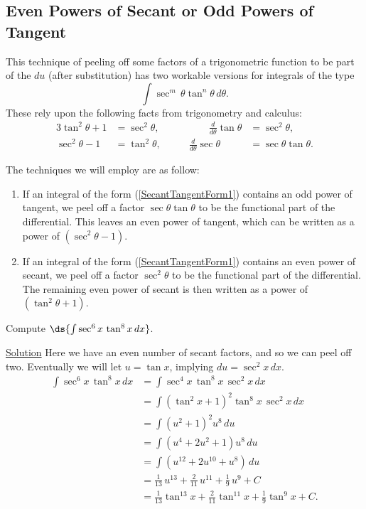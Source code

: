 \subsection{Even Powers of Secant or Odd Powers of Tangent
\label{EvenSecant/OddTangent}}
This technique of peeling off some factors of a trigonometric
function to be part of the $du$ (after substitution) has
two workable versions for integrals of the type
\begin{equation}
\int\sec^m\,\theta\tan^n\theta\,d\theta.\label{SecantTangentForm1}
\end{equation}
These rely upon the following facts from trigonometry and calculus:
\begin{alignat*}{3}
\tan^2\theta+1&=\sec^2\theta,&\qquad\qquad
            \frac{d}{d\theta}\tan\theta&=\sec^2\theta,\\
\sec^2\theta-1&=\tan^2\theta,&\qquad\frac{d}{d\theta}
        \sec\theta&=\sec\theta\tan\theta.\end{alignat*}

The techniques we will employ are as follow:
\begin{enumerate}
\item If an integral of the form (\ref{SecantTangentForm1})
contains an odd power of tangent, we peel off a factor
$\sec\theta\tan\theta$ to be the functional part of the differential.
This leaves an even power of tangent, which can be written as
a power of $\left(\sec^2\theta-1\right)$.
\item If an integral of the form (\ref{SecantTangentForm1})
contains an even power of secant, we peel off a factor
$\sec^2\theta$ to be the functional part of the differential.
The remaining even power of secant is then written as 
a power of $\left(\tan^2\theta+1\right)$.
\end{enumerate}

\bex Compute $\ds{\int\sec^6x\,\tan^8x\,dx}$.

\underline{Solution}  Here we have an even number of secant factors,
and so we can peel off two.  Eventually we will let $u=\tan x$,
implying $du=\sec^2x\,dx$.
\begin{align*}
\int\sec^6x\,\tan^8x\,dx
 &=\int\sec^4x\,\tan^8x\,\sec^2x\,dx\\
 &=\int\left(\tan^2x+1\right)^2\tan^8x\,\sec^2x\,dx\\
 &=\int\left(u^2+1\right)^2u^8\,du\\
 &=\int\left(u^4+2u^2+1\right)u^8\,du\\
 &=\int\left(u^{12}+2u^{10}+u^8\right)\,du\\
 &=\frac1{13}\,u^{13}+\frac2{11}\,u^{11}+\frac19\,u^9+C\\
 &=\frac1{13}\tan^{13}x+\frac2{11}\tan^{11}x+\frac19\tan^9x+C.
\end{align*}
\label{SecEvenTanEven1}\eex

